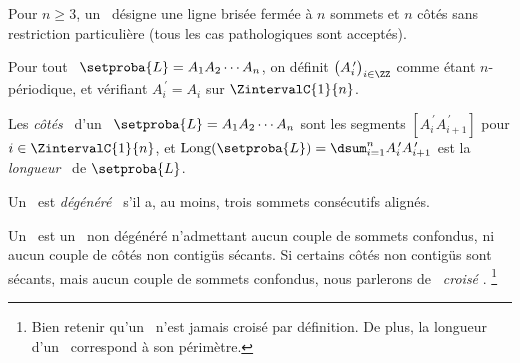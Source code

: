 \begin{defi}
	Pour $n \geq 3$, un \og \emph{\ncycle} \fg\ désigne une ligne brisée fermée à $n$ sommets et $n$ côtés sans restriction particulière (tous les cas pathologiques sont acceptés).
\end{defi}


\begin{defi}
    Pour tout \ncycle\ $\setproba{L} = A_1 A_2 \cdots A_n$, on définit $\big( A^{\,\prime}_i \big)_{i \in \ZZ}$ comme étant $n$-périodique, et vérifiant $A^{\,\prime}_{i} = A_i$ sur $\ZintervalC{1}{n}$.
\end{defi}


\begin{defi}
	Les \og \emph{côtés} \fg\ d'un \ncycle\ $\setproba{L} = A_1 A_2 \cdots A_n$ sont les segments
	$[A^{\,\prime}_i A^{\,\prime}_{i+1}]$ pour $i \in \ZintervalC{1}{n}$,
	et $\perim{\setproba{L}} = \dsum_{i=1}^{n} A^{\,\prime}_i A^{\,\prime}_{i+1}$ est la \og \emph{longueur} \fg\ de $\setproba{L}$.
\end{defi}




\begin{defi}
	Un \ncycle\ est \og \emph{dégénéré} \fg\ s'il a, au moins, trois sommets consécutifs alignés.
\end{defi}




\begin{defi}
	Un \og \emph{\ngone} \fg\ est un \ncycle\ non dégénéré n'admettant aucun couple de sommets confondus, ni aucun couple de côtés non contigüs sécants.
	Si certains côtés non contigüs sont sécants, mais aucun couple de sommets confondus, nous parlerons de \og \emph{\ngone\ croisé} \fg.%
	\footnote{
		Bien retenir qu'un \ngone\ n'est jamais croisé par définition.
		De plus, la longueur d'un \ngone\ correspond à son périmètre.
	}
\end{defi}


%
%
%
%
%
%
